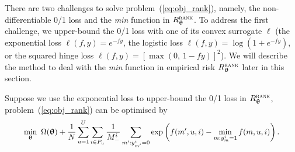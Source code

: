 There are two challenges to %
solve problem~(\ref{eq:obj_rank}),
namely, the non-differentiable 0/1 loss and the \emph{min} function in $R_{{\bm{\uptheta}}}^{\textsc{rank}}$.
To address the first challenge, we upper-bound %
the 0/1 loss with one of its convex surrogate $\ell$
(\eg the exponential loss $\ell(f, y) = e^{-fy}$, the logistic loss $\ell(f, y) = \log(1 + e^{-fy})$,
or the squared hinge loss $\ell(f, y) = [\max(0, \, 1 - fy)]^2$).
We will describe the method to deal with the \emph{min} function in empirical risk $R_{{\bm{\uptheta}}}^{\textsc{rank}}$ later in this section.





Suppose we use the exponential loss %
to upper-bound the 0/1 loss in $R_{{\bm{\uptheta}}}^{\textsc{rank}}$,
problem~(\ref{eq:obj_rank}) can be optimised by
\begin{equation}
\label{eq:expobj_rank}
\resizebox{.908\linewidth}{!}{$\displaystyle
\min_{\upthetabm} \ \Omega(\upthetabm) + \frac{1}{N} \sum_{u=1}^U \sum_{i \in P_u} \frac{1}{M_-^i} 
                  \sum_{m': y_{m'}^i = 0} \exp \left(f(m', u, i) - \min_{m: y_m^i = 1} f(m, u, i) \right).
$}
\end{equation}

